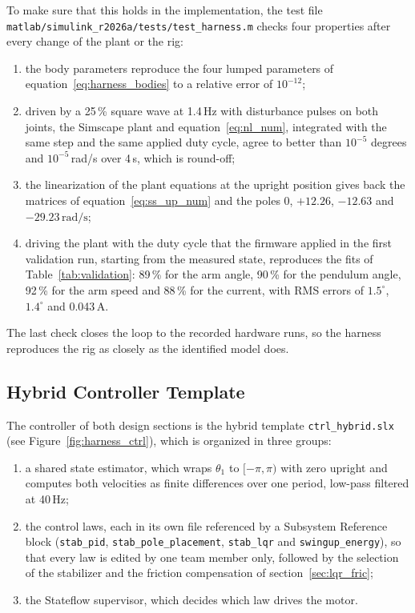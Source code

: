 \documentclass[a4paper,11pt]{article}
\begin{document}
To make sure that this holds in the implementation, the test file \nolinkurl{matlab/simulink_r2026a/tests/test_harness.m} checks four properties after every change of the plant or the rig:
\begin{enumerate}
  \item the body parameters reproduce the four lumped parameters of equation~\ref{eq:harness_bodies} to a relative error of $10^{-12}$;
  \item driven by a 25\,\% square wave at 1.4\,Hz with disturbance pulses on both joints, the Simscape plant and equation~\ref{eq:nl_num}, integrated with the same step and the same applied duty cycle, agree to better than $10^{-5}$ degrees and $10^{-5}$\,rad/s over 4\,s, which is round-off;
  \item the linearization of the plant equations at the upright position gives back the matrices of equation~\ref{eq:ss_up_num} and the poles 0, $+12.26$, $-12.63$ and $-29.23\,\mathrm{rad/s}$;
  \item driving the plant with the duty cycle that the firmware applied in the first validation run, starting from the measured state, reproduces the fits of Table~\ref{tab:validation}: 89\,\% for the arm angle, 90\,\% for the pendulum angle, 92\,\% for the arm speed and 88\,\% for the current, with RMS errors of $1.5^\circ$, $1.4^\circ$ and 0.043\,A.
\end{enumerate}
The last check closes the loop to the recorded hardware runs, so the harness reproduces the rig as closely as the identified model does.

\subsection{Hybrid Controller Template}
\label{sec:harness_ctrl}
The controller of both design sections is the hybrid template \texttt{ctrl\_hybrid.slx} (see Figure~\ref{fig:harness_ctrl}), which is organized in three groups:
\begin{enumerate}
  \item a shared state estimator, which wraps $\theta_1$ to $[-\pi, \pi)$ with zero upright and computes both velocities as finite differences over one period, low-pass filtered at 40\,Hz;
  \item the control laws, each in its own file referenced by a Subsystem Reference block (\texttt{stab\_pid}, \texttt{stab\_pole\_placement}, \texttt{stab\_lqr} and \texttt{swingup\_energy}), so that every law is edited by one team member only, followed by the selection of the stabilizer and the friction compensation of section~\ref{sec:lqr_fric};
  \item the Stateflow supervisor, which decides which law drives the motor.
\end{enumerate}
\end{document}
